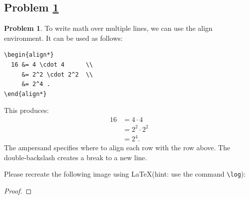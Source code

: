 \documentclass[11pt]{article}
\theoremstyle{definition}
\theoremstyle{definition}
\newtheorem{required}{Problem}
\theoremstyle{definition}
\begin{document}
\newpage
\subsection{Problem \ref{Latex4}}
\begin{required} \label{Latex4}
To write math over multiple lines, we can use the align environment.
It can be used as follows:
\begin{verbatim}
\begin{align*}
  16 &= 4 \cdot 4      \\
     &= 2^2 \cdot 2^2  \\
     &= 2^4 .
\end{align*}
\end{verbatim}
This produces:
\begin{align*}
  16 &= 4 \cdot 4      \\
     &= 2^2 \cdot 2^2  \\
     &= 2^4 .
\end{align*}
The ampersand specifies where to align each row with the row above. The double-backslash creates a break to a new line.

Please recreate the following image using \LaTeX (hint: use the command \texttt{\textbackslash log}):

\begin{center}
\end{center}
\end{required}

\begin{proof}
\end{proof}

\newpage
\end{document}
